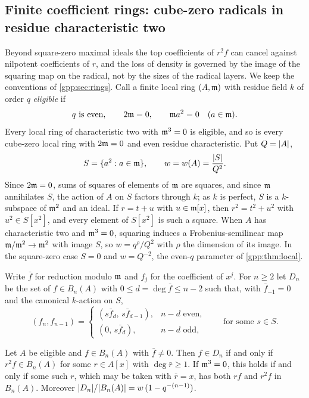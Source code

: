 \subsection{Finite coefficient rings: cube-zero radicals in residue characteristic two}\label{gpp:sec:cubezero}
{\raggedright{}}

Beyond square-zero maximal ideals the top coefficients of $r^2f$ can cancel against
nilpotent coefficients of $r$, and the loss of density is governed by the image of the
squaring map on the radical, not by the sizes of the radical layers. We keep the
conventions of \cref{gpp:sec:rings}. Call a finite local ring $(A,\mathfrak{m})$ with residue field
$k$ of order $q$ \emph{eligible} if
\begin{equation}\label{gpp:eq:eligible}
 q\text{ is even},\qquad 2\mathfrak{m}=0,\qquad \mathfrak{m} a^2=0\quad(a\in\mathfrak{m}).
\end{equation}
Every local ring of characteristic two with $\mathfrak{m}^3=0$ is eligible, and so is every
cube-zero local ring with $2\mathfrak{m}=0$ and even residue characteristic. Put $Q=\lvert A\rvert$,
\[
 S=\{a^2:a\in\mathfrak{m}\},\qquad w=w(A)=\frac{\lvert S\rvert}{Q^2}.
\]
Since $2\mathfrak{m}=0$, sums of squares of elements of $\mathfrak{m}$ are squares, and since $\mathfrak{m}$
annihilates $S$, the action of $A$ on $S$ factors through $k$; as $k$ is perfect, $S$ is a
$k$-subspace of $\mathfrak{m}^2$ and an ideal. If $r=t+u$ with $u\in\mathfrak{m}[x]$, then
$r^2=t^2+u^2$ with $u^2\in S[x^2]$, and every element of $S[x^2]$ is such a square. When
$A$ has characteristic two and $\mathfrak{m}^3=0$, squaring induces a Frobenius-semilinear map
$\mathfrak{m}/\mathfrak{m}^2\to\mathfrak{m}^2$ with image $S$, so $w=q^{\rho}/Q^2$ with $\rho$ the dimension of
its image. In the square-zero case $S=0$ and $w=Q^{-2}$, the even-$q$ parameter of
\cref{gpp:thm:local}.

Write $\bar f$ for reduction modulo $\mathfrak{m}$ and $f_j$ for the coefficient of $x^j$. For
$n\ge2$ let $D_n$ be the set of $f\in B_n(A)$ with $0\le d=\deg\bar f\le n-2$ such that,
with $\bar f_{-1}=0$ and the canonical $k$-action on $S$,
\begin{equation}\label{gpp:eq:squarestart}
 (f_n,f_{n-1})=\begin{cases}(s\bar f_d,\,s\bar f_{d-1}),&n-d\text{ even},\\
 (0,\,s\bar f_d),&n-d\text{ odd},\end{cases}\qquad\text{for some }s\in S .
\end{equation}

\begin{theorem}\label{gpp:thm:squarestart}
Let $A$ be eligible and $f\in B_n(A)$ with $\bar f\ne0$. Then $f\in D_n$ if and only if
$r^2f\in B_n(A)$ for some $r\in A[x]$ with $\deg\bar r\ge1$. If $\mathfrak{m}^3=0$, this holds if
and only if some such $r$, which may be taken with $\bar r=x$, has both $rf$ and $r^2f$ in
$B_n(A)$. Moreover $\lvert D_n\rvert/\lvert B_n(A)\rvert=w\,(1-q^{-(n-1)})$.
\end{theorem}

